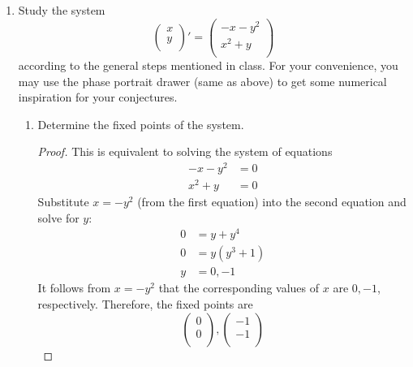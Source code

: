 \documentclass[../psets.tex]{subfiles}
\begin{document}
\begin{enumerate}
\begin{enumerate}
\begin{proof}
        \end{proof}
    \end{enumerate}
    \item Study the system
    \begin{equation*}
        \begin{pmatrix}
            x\\
            y\\
        \end{pmatrix}'
        =
        \begin{pmatrix}
            -x-y^2\\
            x^2+y\\
        \end{pmatrix}
    \end{equation*}
    according to the general steps mentioned in class. For your convenience, you may use the phase portrait drawer (same as above) to get some numerical inspiration for your conjectures.
    \begin{enumerate}
        \item Determine the fixed points of the system.
        \begin{proof}
            This is equivalent to solving the system of equations
            \begin{align*}
                -x-y^2 &= 0\\
                x^2+y &= 0
            \end{align*}
            Substitute $x=-y^2$ (from the first equation) into the second equation and solve for $y$:
            \begin{align*}
                0 &= y+y^4\\
                0 &= y(y^3+1)\\
                y &= 0,-1
            \end{align*}
            It follows from $x=-y^2$ that the corresponding values of $x$ are $0,-1$, respectively. Therefore, the fixed points are
            \begin{equation*}
                \boxed{
                    \begin{pmatrix}
                        0\\
                        0\\
                    \end{pmatrix},
                    \begin{pmatrix}
                        -1\\
                        -1\\

\end{pmatrix}}
\end{equation*}
\end{proof}
\end{enumerate}
\end{enumerate}
\end{document}
